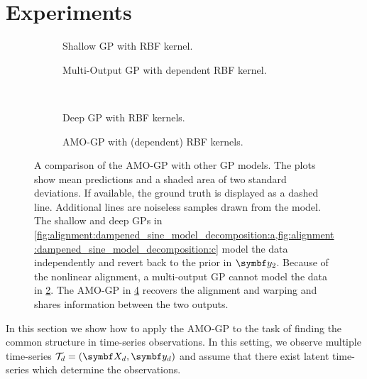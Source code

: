 \section{Experiments}
\label{toc:alignment:experiments}
\begin{figure}[tp]
    \centering
    \begin{subfigure}{\halffigurewidth}
        \centering
        \caption{
            Shallow GP with RBF kernel.
            \label{fig:alignment:dampened_sine_model_decomposition:a}
        }
    \end{subfigure}
    \hfill
    \begin{subfigure}{\halffigurewidth}
        \centering
        \caption{
            Multi-Output GP with dependent RBF kernel.
            \label{fig:alignment:dampened_sine_model_decomposition:b}
        }
    \end{subfigure}
    \\[.25\figureskip]
    \begin{subfigure}{\halffigurewidth}
        \centering
        \caption{
            Deep GP with RBF kernels.
            \label{fig:alignment:dampened_sine_model_decomposition:c}
        }
    \end{subfigure}
    \hfill
    \begin{subfigure}{\halffigurewidth}
        \centering
        \caption{
            AMO-GP with (dependent) RBF kernels.
            \label{fig:alignment:dampened_sine_model_decomposition:d}
        }
    \end{subfigure}
    \caption[Artificial composite experiment]{
        \label{fig:alignment:dampened_sine_model_decomposition}
        A comparison of the AMO-GP with other GP models.
        The plots show mean predictions and a shaded area of two standard deviations.
        If available, the ground truth is displayed as a dashed line.
        Additional lines are noiseless samples drawn from the model.
        The shallow and deep GPs in \cref{fig:alignment:dampened_sine_model_decomposition:a,fig:alignment:dampened_sine_model_decomposition:c} model the data independently and revert back to the prior in $\rv{y}_2$.
        Because of the nonlinear alignment, a multi-output GP cannot model the data in \cref{fig:alignment:dampened_sine_model_decomposition:b}.
        The AMO-GP in \cref{fig:alignment:dampened_sine_model_decomposition:d} recovers the alignment and warping and shares information between the two outputs.
    }
\end{figure}
In this section we show how to apply the AMO-GP to the task of finding the common structure in time-series observations.
In this setting, we observe multiple time-series $\Tc_d = (\mat{X}_d, \mat{y}_d)$ and assume that there exist latent time-series which determine the observations.

